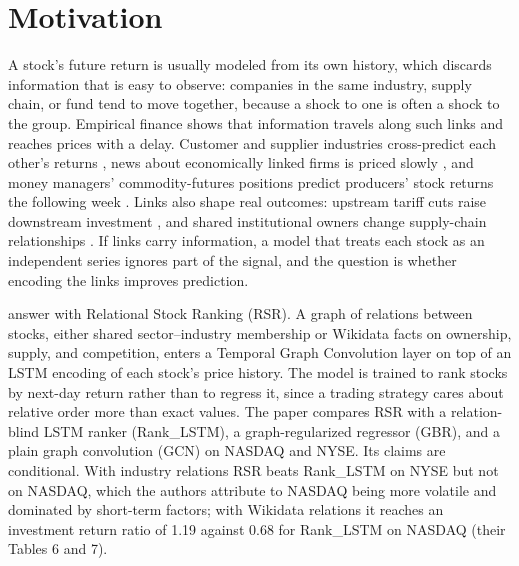 \documentclass[12pt]{article}
\begin{document}
\newpage
\clearpage


\section{Motivation}
\label{sec:motivation}

A stock's future return is usually modeled from its own history, which discards information that
is easy to observe: companies in the same industry, supply chain, or fund tend to move together,
because a shock to one is often a shock to the group. Empirical finance shows that information
travels along such links and reaches prices with a delay. Customer and supplier industries
cross-predict each other's returns \citep{menzly2010market}, news about economically linked firms
is priced slowly \citep{cohen2008economic}, and money managers' commodity-futures positions
predict producers' stock returns the following week \citep{ho2023smart}. Links also shape real
outcomes: upstream tariff cuts raise downstream investment \citep{martin2024downstream}, and
shared institutional owners change supply-chain relationships \citep{freeman2025overlapping}. If
links carry information, a model that treats each stock as an independent series ignores part of
the signal, and the question is whether encoding the links improves prediction.

\citet{feng2019temporal} answer with Relational Stock Ranking (RSR). A graph of relations between
stocks, either shared sector--industry membership or Wikidata facts on ownership, supply, and
competition, enters a Temporal Graph Convolution layer on top of an LSTM encoding of each stock's
price history. The model is trained to rank stocks by next-day return rather than to regress it,
since a trading strategy cares about relative order more than exact values. The paper compares
RSR with a relation-blind LSTM ranker (Rank\_LSTM), a graph-regularized regressor (GBR), and a
plain graph convolution (GCN) on NASDAQ and NYSE. Its claims are conditional. With industry
relations RSR beats Rank\_LSTM on NYSE but not on NASDAQ, which the authors attribute to NASDAQ
being more volatile and dominated by short-term factors; with Wikidata relations it reaches an
investment return ratio of 1.19 against 0.68 for Rank\_LSTM on NASDAQ (their Tables 6 and 7).
\end{document}
